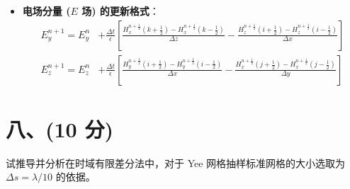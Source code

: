 \documentclass[11pt, a4paper]{article}
\begin{document}
\begin{tcolorbox}[colback=white, colframe=black, title=【解答】（第五章-1 27页）]
\begin{itemize}
    \item \textbf{电场分量 ($E$ 场) 的更新格式}：
    \begin{align*}
        E_y^{n+1} = E_y^n & + \frac{\Delta t}{\epsilon} \left[ \frac{H_x^{n+\frac{1}{2}}(k+\frac{1}{2}) - H_x^{n+\frac{1}{2}}(k-\frac{1}{2})}{\Delta z} - \frac{H_z^{n+\frac{1}{2}}(i+\frac{1}{2}) - H_z^{n+\frac{1}{2}}(i-\frac{1}{2})}{\Delta x} \right] \\
        E_z^{n+1} = E_z^n & + \frac{\Delta t}{\epsilon} \left[ \frac{H_y^{n+\frac{1}{2}}(i+\frac{1}{2}) - H_y^{n+\frac{1}{2}}(i-\frac{1}{2})}{\Delta x} - \frac{H_x^{n+\frac{1}{2}}(j+\frac{1}{2}) - H_x^{n+\frac{1}{2}}(j-\frac{1}{2})}{\Delta y} \right]
    \end{align*}
\end{itemize}
\end{tcolorbox}

\section*{八、(10 分)}
试推导并分析在时域有限差分法中，对于 Yee 网格抽样标准网格的大小选取为 $\Delta s = \lambda / 10$ 的依据。
\end{document}
